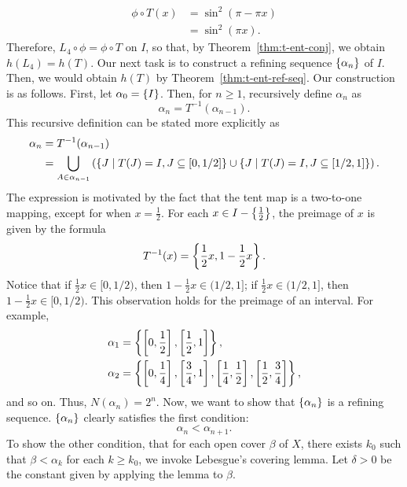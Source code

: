\documentclass[12pt,twoside,draft]{book}
\begin{document}
\begin{align*}
  \phi \circ T(x)
  &= \sin^2(\pi - \pi x) \\
  &= \sin^2(\pi x).
\end{align*}
Therefore, $L_4 \circ \phi = \phi \circ T$ on $I$, so that, by Theorem~\ref{thm:t-ent-conj}, we obtain $h(L_4) = h(T)$.
Our next task is to construct a refining sequence $\left \{ \alpha_n \right \}$ of $I$.
Then, we would obtain $h(T)$ by Theorem~\ref{thm:t-ent-ref-seq}.
Our construction is as follows.
First, let $\alpha_0 = \left \{ I \right \}$.
Then, for $n \geq 1$, recursively define $\alpha_n$ as
\begin{equation*}
  \alpha_n = T^{-1}(\alpha_{n-1}).
\end{equation*}
%
This recursive definition can be stated more explicitly as
\begin{align*}
  \alpha_n &= T^{-1}(\alpha_{n-1}) \\
  &= \bigcup\limits_{A \in \alpha_{n-1}} \left (  \left \{ J \mathrel{} \middle| \mathrel{} T(J) = I, J \subseteq [0,1/2] \right \} \cup \left \{ J \mathrel{} \middle| \mathrel{} T(J) = I, J \subseteq [1/2,1] \right \} \right ).
\end{align*}
The expression is motivated by the fact that the tent map is a two-to-one mapping, except for when $x = \frac{1}{2}$.
For each $x \in I - \left \{ \frac{1}{2} \right \}$, the preimage of $x$ is given by the formula
\begin{equation*}
  T^{-1}(x) = \left \{ \frac{1}{2} x, 1 - \frac{1}{2} x \right \}.
\end{equation*}
Notice that if $\frac{1}{2} x \in [0,1/2)$, then $1 - \frac{1}{2} x \in (1/2,1]$; if $\frac{1}{2} x \in (1/2,1]$, then $1 - \frac{1}{2} x \in [0,1/2)$.
  This observation holds for the preimage of an interval.
  For example,
  \begin{align*}
    \alpha_1 &= \left \{ \left [ 0,\frac{1}{2} \right ], \left [ \frac{1}{2}, 1 \right ] \right \}, \\
    \alpha_2 &= \left \{ \left [ 0,\frac{1}{4} \right ], \left [ \frac{3}{4}, 1 \right ], \left [ \frac{1}{4}, \frac{1}{2} \right ], \left [ \frac{1}{2}, \frac{3}{4} \right ] \right \},
  \end{align*}
  and so on.
  Thus, $N(\alpha_{n}) = 2^n$.
  Now, we want to show that $\left \{ \alpha_n \right \}$ is a refining sequence.
  $\left \{ \alpha_n \right \}$ clearly satisfies the first condition:
  \begin{equation*}
    \alpha_n < \alpha_{n+1}.
  \end{equation*}
  To show the other condition, that for each open cover $\beta$ of $X$, there exists $k_0$ such that $\beta < \alpha_k$ for each $k \geq k_0$, we invoke Lebesgue's covering lemma.
  Let $\delta > 0$ be the constant given by applying the lemma to $\beta$.
\end{document}
